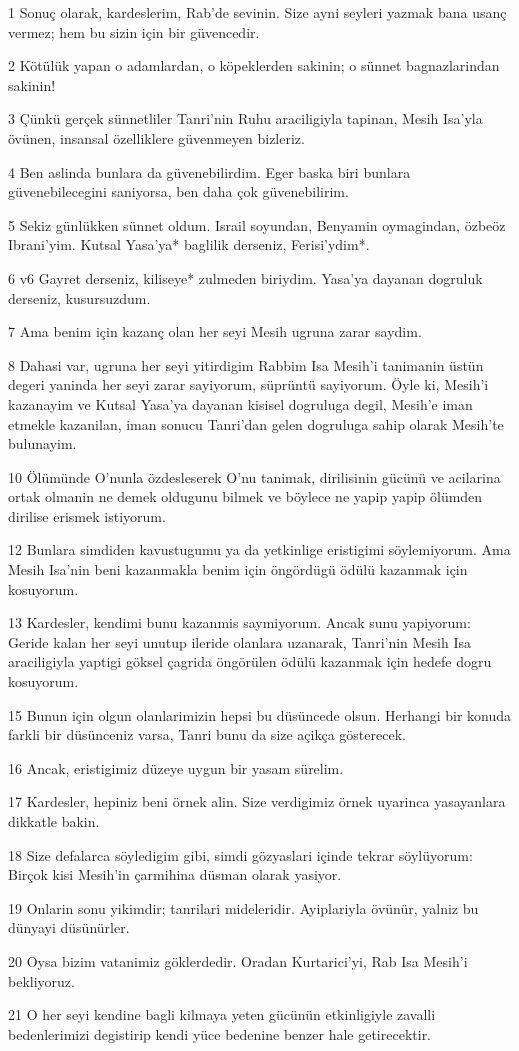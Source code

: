 \par 1 Sonuç olarak, kardeslerim, Rab'de sevinin. Size ayni seyleri yazmak bana usanç vermez; hem bu sizin için bir güvencedir.
\par 2 Kötülük yapan o adamlardan, o köpeklerden sakinin; o sünnet bagnazlarindan sakinin!
\par 3 Çünkü gerçek sünnetliler Tanri'nin Ruhu araciligiyla tapinan, Mesih Isa'yla övünen, insansal özelliklere güvenmeyen bizleriz.
\par 4 Ben aslinda bunlara da güvenebilirdim. Eger baska biri bunlara güvenebilecegini saniyorsa, ben daha çok güvenebilirim.
\par 5 Sekiz günlükken sünnet oldum. Israil soyundan, Benyamin oymagindan, özbeöz Ibrani'yim. Kutsal Yasa'ya* baglilik derseniz, Ferisi'ydim*.
\par 6 v6 Gayret derseniz, kiliseye* zulmeden biriydim. Yasa'ya dayanan dogruluk derseniz, kusursuzdum.
\par 7 Ama benim için kazanç olan her seyi Mesih ugruna zarar saydim.
\par 8 Dahasi var, ugruna her seyi yitirdigim Rabbim Isa Mesih'i tanimanin üstün degeri yaninda her seyi zarar sayiyorum, süprüntü sayiyorum. Öyle ki, Mesih'i kazanayim ve Kutsal Yasa'ya dayanan kisisel dogruluga degil, Mesih'e iman etmekle kazanilan, iman sonucu Tanri'dan gelen dogruluga sahip olarak Mesih'te bulunayim.
\par 10 Ölümünde O'nunla özdesleserek O'nu tanimak, dirilisinin gücünü ve acilarina ortak olmanin ne demek oldugunu bilmek ve böylece ne yapip yapip ölümden dirilise erismek istiyorum.
\par 12 Bunlara simdiden kavustugumu ya da yetkinlige eristigimi söylemiyorum. Ama Mesih Isa'nin beni kazanmakla benim için öngördügü ödülü kazanmak için kosuyorum.
\par 13 Kardesler, kendimi bunu kazanmis saymiyorum. Ancak sunu yapiyorum: Geride kalan her seyi unutup ileride olanlara uzanarak, Tanri'nin Mesih Isa araciligiyla yaptigi göksel çagrida öngörülen ödülü kazanmak için hedefe dogru kosuyorum.
\par 15 Bunun için olgun olanlarimizin hepsi bu düsüncede olsun. Herhangi bir konuda farkli bir düsünceniz varsa, Tanri bunu da size açikça gösterecek.
\par 16 Ancak, eristigimiz düzeye uygun bir yasam sürelim.
\par 17 Kardesler, hepiniz beni örnek alin. Size verdigimiz örnek uyarinca yasayanlara dikkatle bakin.
\par 18 Size defalarca söyledigim gibi, simdi gözyaslari içinde tekrar söylüyorum: Birçok kisi Mesih'in çarmihina düsman olarak yasiyor.
\par 19 Onlarin sonu yikimdir; tanrilari mideleridir. Ayiplariyla övünür, yalniz bu dünyayi düsünürler.
\par 20 Oysa bizim vatanimiz göklerdedir. Oradan Kurtarici'yi, Rab Isa Mesih'i bekliyoruz.
\par 21 O her seyi kendine bagli kilmaya yeten gücünün etkinligiyle zavalli bedenlerimizi degistirip kendi yüce bedenine benzer hale getirecektir.

